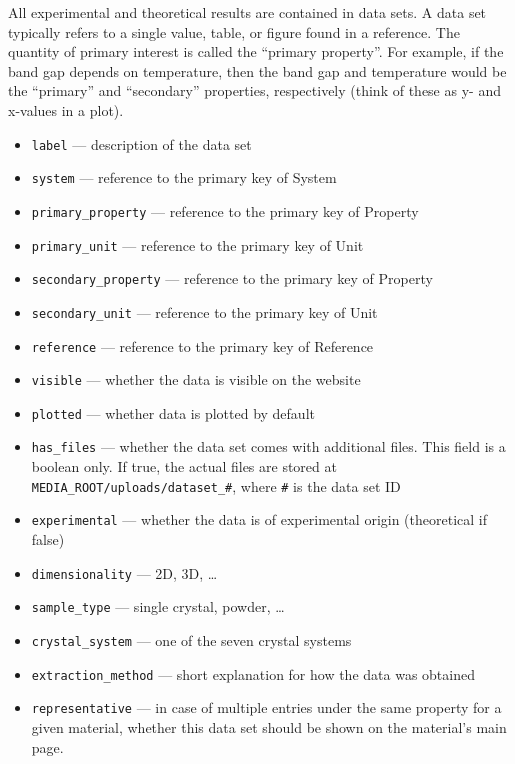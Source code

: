 \documentclass{article}
\begin{document}
All experimental and theoretical results are contained in data sets. A data set typically refers to a single value, table, or figure found in a reference. The quantity of primary interest is called the ``primary property''. For example, if the band gap depends on temperature, then the band gap and temperature would be the ``primary'' and ``secondary'' properties, respectively (think of these as y- and x-values in a plot).
\begin{tcolorbox}[colback=green!5,colframe=green!40!black,title=Dataset(Base)]
  \begin{itemize}
  \item \texttt{label} --- description of the data set
  \item \texttt{system} --- reference to the primary key of System
  \item \texttt{primary\_property} --- reference to the primary key of Property
  \item \texttt{primary\_unit} --- reference to the primary key of Unit
  \item \texttt{secondary\_property} --- reference to the primary key of Property
  \item \texttt{secondary\_unit} --- reference to the primary key of Unit
  \item \texttt{reference} --- reference to the primary key of Reference
  \item \texttt{visible} --- whether the data is visible on the website
  \item \texttt{plotted} --- whether data is plotted by default
  \item \texttt{has\_files} --- whether the data set comes with additional files. This field is a boolean only. If true, the actual files are stored at \verb+MEDIA_ROOT/uploads/dataset_#+, where \verb+#+ is the data set ID
  \item \texttt{experimental} --- whether the data is of experimental origin (theoretical if false)
  \item \texttt{dimensionality} --- 2D, 3D, \ldots
  \item \texttt{sample\_type} --- single crystal, powder, \ldots
  \item \texttt{crystal\_system} --- one of the seven crystal systems
  \item \texttt{extraction\_method} --- short explanation for how the data was obtained
  \item \texttt{representative} --- in case of multiple entries under the same property for a given material, whether this data set should be shown on the material's main page.
  \end{itemize}
\end{tcolorbox}
\end{document}
